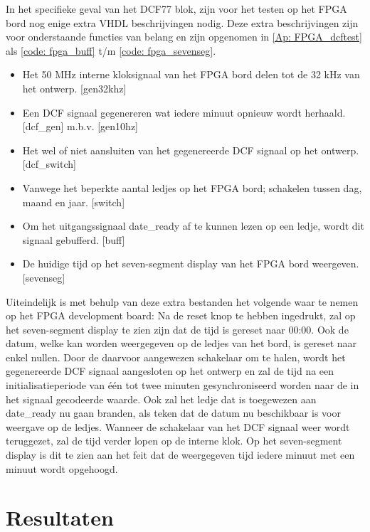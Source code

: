 \noindent In het specifieke geval van het DCF77 blok, zijn voor het testen op het FPGA bord nog enige extra VHDL beschrijvingen nodig. Deze extra beschrijvingen zijn voor onderstaande functies van belang en zijn opgenomen in \cref{Ap: FPGA_dcftest} als \cref{code: fpga_buff} t/m \cref{code: fpga_sevenseg}.
\begin{itemize}[nolistsep]
\item Het 50 MHz interne kloksignaal van het FPGA bord delen tot de 32 kHz van het ontwerp. [gen32khz]
\item Een DCF signaal gegenereren wat iedere minuut opnieuw wordt herhaald. [dcf\_gen] m.b.v. [gen10hz]
\item Het wel of niet aansluiten van het gegenereerde DCF signaal op het ontwerp. [dcf\_switch]
\item Vanwege het beperkte aantal ledjes op het FPGA bord; schakelen tussen dag, maand en jaar. [switch]
\item Om het uitgangssignaal date\_ready af te kunnen lezen op een ledje, wordt dit signaal gebufferd. [buff]
\item De huidige tijd op het seven-segment display van het FPGA bord weergeven. [sevenseg]\\
\end{itemize}
Uiteindelijk is met behulp van deze extra bestanden het volgende waar te nemen op het FPGA development board: Na de reset knop te hebben ingedrukt, zal op het seven-segment display te zien zijn dat de tijd is gereset naar 00:00. Ook de datum, welke kan worden weergegeven op de ledjes van het bord, is gereset naar enkel nullen. Door de daarvoor aangewezen schakelaar om te halen, wordt het gegenereerde DCF signaal aangesloten op het ontwerp en zal de tijd na een initialisatieperiode van \'e\'en tot twee minuten gesynchroniseerd worden naar de in het signaal gecodeerde waarde. Ook zal het ledje dat is toegewezen aan date\_ready nu gaan branden, als teken dat de datum nu beschikbaar is voor weergave op de ledjes. Wanneer de schakelaar van het DCF signaal weer wordt teruggezet, zal de tijd verder lopen op de interne klok. Op het seven-segment display is dit te zien aan het feit dat de weergegeven tijd iedere minuut met een minuut wordt opgehoogd.

\section{Resultaten}